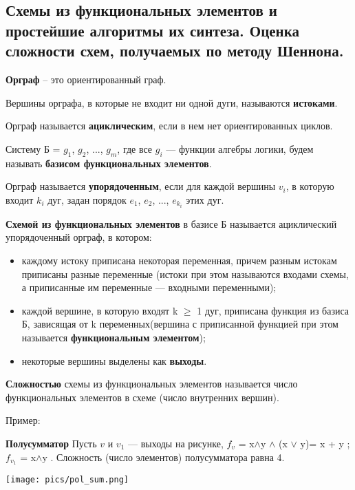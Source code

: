 \subsection{Схемы из функциональных элементов и простейшие алгоритмы их синтеза. Оценка сложности схем, получаемых по методу Шеннона.}

\textbf{Орграф} -- это ориентированный граф.

Вершины орграфа, в которые не входит ни одной дуги, называются \textbf{истоками}.

Орграф называется \textbf{ациклическим}, если в нем нет ориентированных циклов.

Систему Б = {$g_1$, $g_2$, ..., $g_m$}, где все $g_i$ — функции алгебры логики, будем называть \textbf{базисом функциональных элементов}.

Орграф называется \textbf{упорядоченным}, если для каждой вершины $v_i$, в которую входит $k_i$ дуг, задан порядок $e_1$, $e_2$, ..., $e_{k_i}$ этих дуг.

\bigbreak

\textbf{Схемой из функциональных элементов} в базисе Б называется ациклический упорядоченный орграф, в котором:
\begin{itemize}
    \item каждому истоку приписана некоторая переменная, причем разным истокам приписаны разные переменные (истоки при этом называются входами схемы, а приписанные им переменные — входными переменными);
    \item каждой вершине, в которую входят k $\geq$ 1 дуг, приписана функция из базиса Б, зависящая от k переменных(вершина с приписанной функцией при этом называется \textbf{функциональным элементом}); 
    \item некоторые вершины выделены как \textbf{выходы}. 
\end{itemize}

\textbf{Сложностью} схемы из функциональных элементов называется число функциональных элементов в схеме (число внутренних вершин).

Пример:

\textbf{Полусумматор} Пусть $v$ и $v_1$ — выходы на рисунке, $f_v$ = x$\wedge$y $\wedge$ (x $\vee$ y)= x + y ; $f_{v_1}$ = x$\wedge$y . Сложность (число элементов) полусумматора равна 4.

\texttt{[image: pics/pol\_sum.png]}


